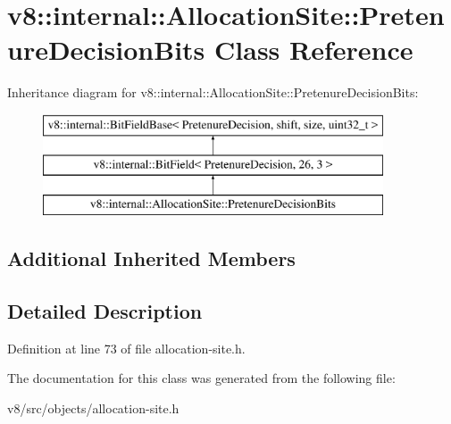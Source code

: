 \hypertarget{classv8_1_1internal_1_1AllocationSite_1_1PretenureDecisionBits}{}\section{v8\+:\+:internal\+:\+:Allocation\+Site\+:\+:Pretenure\+Decision\+Bits Class Reference}
\label{classv8_1_1internal_1_1AllocationSite_1_1PretenureDecisionBits}
Inheritance diagram for v8\+:\+:internal\+:\+:Allocation\+Site\+:\+:Pretenure\+Decision\+Bits\+:\begin{figure}[H]
\begin{center}
\leavevmode
\includegraphics[height=3.000000cm]{classv8_1_1internal_1_1AllocationSite_1_1PretenureDecisionBits}
\end{center}
\end{figure}
\subsection*{Additional Inherited Members}


\subsection{Detailed Description}


Definition at line 73 of file allocation-\/site.\+h.



The documentation for this class was generated from the following file\+:\begin{DoxyCompactItemize}
\item 
v8/src/objects/allocation-\/site.\+h\end{DoxyCompactItemize}
